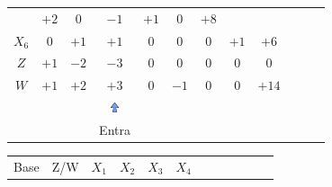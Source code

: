 \documentclass{beamer}
\begin{document}
\begin{frame}
{\begin{table}
\begin{tabular}{c c c c c c c c c c c c}
				& \cellcolor{gray!50} $\scriptstyle +2$
				& \cellcolor{yellow!50} $\scriptstyle 0$			
				& \cellcolor{yellow!50} $\scriptstyle -1$
				& \cellcolor{yellow!50} $\scriptstyle +1$
				& \cellcolor{yellow!50} $\scriptstyle 0$ 
				& \cellcolor{yellow!50} $\scriptstyle +8$ \\
				\cellcolor{blue!100} \color{red} $\scriptstyle X_6$
				& \cellcolor{yellow!50} $\scriptstyle 0$
				& \cellcolor{yellow!50} $\scriptstyle +1$
				& \cellcolor{gray!50} $\scriptstyle +1$
				& \cellcolor{yellow!50} $\scriptstyle 0$
				& \cellcolor{yellow!50} $\scriptstyle 0$
				& \cellcolor{yellow!50} $\scriptstyle 0$
				& \cellcolor{yellow!50} $\scriptstyle +1$
				& \cellcolor{yellow!50} $\scriptstyle +6$ \\
				\cellcolor{blue!100} \color{white} $\scriptstyle Z$
				& \cellcolor{yellow!50} $\scriptstyle +1$
				& \cellcolor{yellow!50} $\scriptstyle -2$
				& \cellcolor{gray!50} $\scriptstyle -3$
				& \cellcolor{yellow!50} $\scriptstyle 0$
				& \cellcolor{yellow!50} $\scriptstyle 0$
				& \cellcolor{yellow!50} $\scriptstyle 0$
				& \cellcolor{yellow!50} $\scriptstyle 0$ 
				& \cellcolor{yellow!50} $\scriptstyle 0$  \\
				\cellcolor{blue!100} \color{white} $\scriptstyle W$
				& \cellcolor{yellow!90} $\scriptstyle +1$
				& \cellcolor{yellow!90} $\scriptstyle +2$
				& \cellcolor{gray!50} $\scriptstyle +3$
				& \cellcolor{yellow!90} $\scriptstyle 0$
				& \cellcolor{yellow!90} $\scriptstyle -1$
				& \cellcolor{yellow!90} $\scriptstyle 0$
				& \cellcolor{yellow!90} $\scriptstyle 0$ 
				& \cellcolor{yellow!90} $\scriptstyle +14$  \\
				& & &  \includegraphics[width=0.3cm,height=0.3cm]{setacima.jpg} \\
				& & &  \scriptsize Entra \\
			\end{tabular}
		\end{table}			
	}
	{
		\begin{table}		
			\begin{tabular}{c c c c c c c c c c c c}
				\cline{1-8} 
				\cellcolor{blue!100} \color{white} \scriptsize Base 
				&\cellcolor{blue!100} \color{white} \scriptsize Z/W
				&\cellcolor{blue!100} \color{white} $\scriptstyle X_1$ 
				&\cellcolor{blue!100} \color{white} $\scriptstyle X_2$ 
				&\cellcolor{blue!100} \color{red}   $\scriptstyle X_3$ 
				&\cellcolor{blue!100} \color{white} $\scriptstyle X_4$ 

\end{tabular}
\end{table}}
\end{frame}
\end{document}

